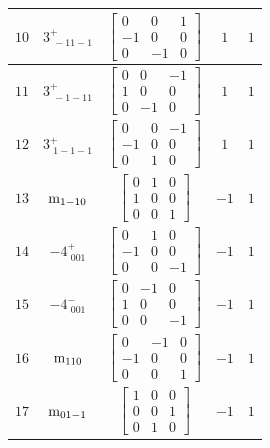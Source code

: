 \documentclass[fleqn,8pt]{jsarticle}
\begin{document}
\begin{longtable}{ccccc}
$ 10 $ & $ 3^{+}_{\,\,-11-1} $ & $ \begin{bmatrix} 0 & 0 & 1 \\ -1 & 0 & 0 \\ 0 & -1 & 0 \end{bmatrix} $ & $ 1 $ & $ 1 $ \\ \hline
$ 11 $ & $ 3^{+}_{\,\,-1-11} $ & $ \begin{bmatrix} 0 & 0 & -1 \\ 1 & 0 & 0 \\ 0 & -1 & 0 \end{bmatrix} $ & $ 1 $ & $ 1 $ \\ \hline
$ 12 $ & $ 3^{+}_{\,\,1-1-1} $ & $ \begin{bmatrix} 0 & 0 & -1 \\ -1 & 0 & 0 \\ 0 & 1 & 0 \end{bmatrix} $ & $ 1 $ & $ 1 $ \\ \hline
$ 13 $ & $ {\rm m}_{1-10} $ & $ \begin{bmatrix} 0 & 1 & 0 \\ 1 & 0 & 0 \\ 0 & 0 & 1 \end{bmatrix} $ & $ -1 $ & $ 1 $ \\ \hline
$ 14 $ & $ -4^{+}_{\,\,001} $ & $ \begin{bmatrix} 0 & 1 & 0 \\ -1 & 0 & 0 \\ 0 & 0 & -1 \end{bmatrix} $ & $ -1 $ & $ 1 $ \\ \hline
$ 15 $ & $ -4^{-}_{\,\,001} $ & $ \begin{bmatrix} 0 & -1 & 0 \\ 1 & 0 & 0 \\ 0 & 0 & -1 \end{bmatrix} $ & $ -1 $ & $ 1 $ \\ \hline
$ 16 $ & $ {\rm m}_{110} $ & $ \begin{bmatrix} 0 & -1 & 0 \\ -1 & 0 & 0 \\ 0 & 0 & 1 \end{bmatrix} $ & $ -1 $ & $ 1 $ \\ \hline
$ 17 $ & $ {\rm m}_{01-1} $ & $ \begin{bmatrix} 1 & 0 & 0 \\ 0 & 0 & 1 \\ 0 & 1 & 0 \end{bmatrix} $ & $ -1 $ & $ 1 $ \\ \hline

\end{longtable}
\end{document}

